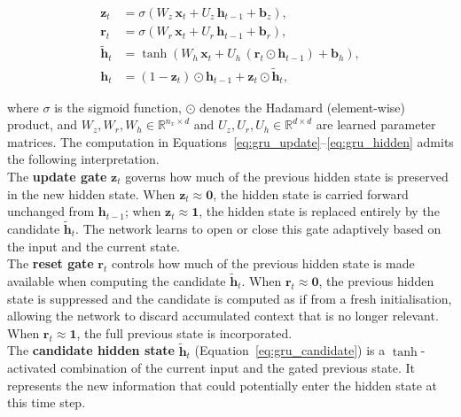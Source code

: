     \begin{align}
    \mathbf{z}_t &= \sigma\!\left(W_z\, \mathbf{x}_t
    + U_z\, \mathbf{h}_{t-1} + \mathbf{b}_z\right), \label{eq:gru_update} \\
    \mathbf{r}_t &= \sigma\!\left(W_r\, \mathbf{x}_t
    + U_r\, \mathbf{h}_{t-1} + \mathbf{b}_r\right), \label{eq:gru_reset} \\
    \tilde{\mathbf{h}}_t &= \tanh\!\left(W_h\, \mathbf{x}_t
    + U_h\,(\mathbf{r}_t \odot \mathbf{h}_{t-1}) + \mathbf{b}_h\right),
    \label{eq:gru_candidate} \\
    \mathbf{h}_t &= (1 - \mathbf{z}_t) \odot \mathbf{h}_{t-1}
    + \mathbf{z}_t \odot \tilde{\mathbf{h}}_t, \label{eq:gru_hidden}
    \end{align}

    \noindent 
    where $\sigma$ is the sigmoid function, $\odot$ denotes the Hadamard (element-wise) product, and $W_z, W_r, W_h \in \mathbb{R}^{n_x \times d}$ and $U_z, U_r, U_h \in \mathbb{R}^{d \times d}$ are learned parameter matrices. The
    computation in Equations~\eqref{eq:gru_update}--\eqref{eq:gru_hidden} admits the following interpretation. \\

    \noindent 
    The \textbf{update gate} $\mathbf{z}_t$ governs how much of the previous hidden state is preserved in the new hidden state. When $\mathbf{z}_t \approx \mathbf{0}$, the hidden state is carried forward unchanged from $\mathbf{h}_{t-1}$; when $\mathbf{z}_t \approx \mathbf{1}$, the hidden state is replaced entirely by the candidate $\tilde{\mathbf{h}}_t$. The network learns to open or close this gate adaptively based on the input and the current state. \\

    \noindent 
    The \textbf{reset gate} $\mathbf{r}_t$ controls how much of the previous hidden state is made available when computing the candidate $\tilde{\mathbf{h}}_t$. When $\mathbf{r}_t \approx \mathbf{0}$, the previous hidden state is suppressed and the candidate is computed as if from a fresh initialisation, allowing the network to discard accumulated context that is no longer relevant. When $\mathbf{r}_t \approx \mathbf{1}$, the full previous state is incorporated.\\

    \noindent 
    The \textbf{candidate hidden state} $\tilde{\mathbf{h}}_t$
    (Equation~\eqref{eq:gru_candidate}) is a $\tanh$-activated combination of the
    current input and the gated previous state. It represents the new information that
    could potentially enter the hidden state at this time step. \\

